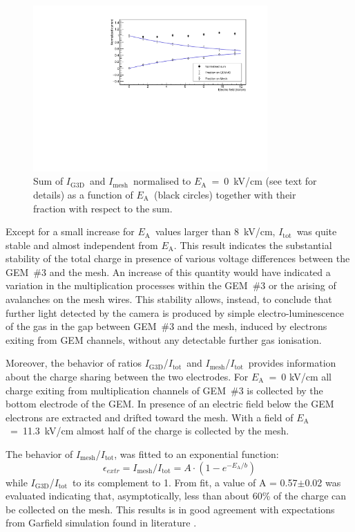 \documentclass[a4paper,11pt]{article}
\newcommand{\Itot}{$I_{\mathrm{tot}}$}
\newcommand{\Ig}  {$I_{\mathrm{G3D}}$}
\newcommand{\Ime}  {$I_{\mathrm{mesh}}$}
\newcommand{\Ea}  {$E_{\mathrm{A}}$}
\begin{document}
\begin{figure}[ht]
\centering
\includegraphics[width=0.80\textwidth]{currents.pdf}
\caption{Sum of \Ig\ and \Ime\ normalised to \Ea~=~0~kV/cm (see text for details) as a function of \Ea\  (black circles) together with their 
fraction with respect to the sum.} 
\label{fig:currents}
\end{figure}

Except for a small increase for \Ea\ values larger than 8~kV/cm, \Itot\ was quite stable and almost independent from \Ea. This result indicates the substantial stability of the total charge in presence of various voltage differences between the GEM~\#3 and the mesh. An increase of this quantity would have indicated a variation in the multiplication processes within the GEM~\#3 or the arising of avalanches on the mesh wires.
This stability allows, instead, to conclude that further light detected by the camera is produced by simple electro-luminescence of the gas in the gap between GEM~\#3 and the mesh, induced by electrons exiting from GEM channels, without any detectable further gas ionisation.

Moreover, the behavior of ratios  \Ig/\Itot\ and \Ime/\Itot\ provides information about the charge sharing between the two electrodes.
For \Ea~=~0 kV/cm all charge exiting from multiplication channels of GEM~\#3 is collected by the bottom electrode of the GEM. In presence of an electric field below the GEM electrons are extracted and drifted toward the mesh. With a field of \Ea~=~11.3~kV/cm almost half of the charge is collected by the mesh.

The behavior of \Ime /\Itot, was fitted to an exponential function:
$$
\epsilon_{extr} = I_{\mathrm{mesh}}/I_{\mathrm{tot}} = A\cdot(1-e^{-E_{\mathrm{A}}/b})
$$
while \Ig/\Itot\ to its complement to 1.
From fit, a value of A = 0.57$\pm$0.02 was evaluated indicating that, asymptotically, less than about 60\% of the charge can be collected on the mesh. This results is in good agreement with expectations from Garfield simulation found in literature \cite{bib:thesis, bib:Bonivento, bib:ieee_benci}.
\end{document}
